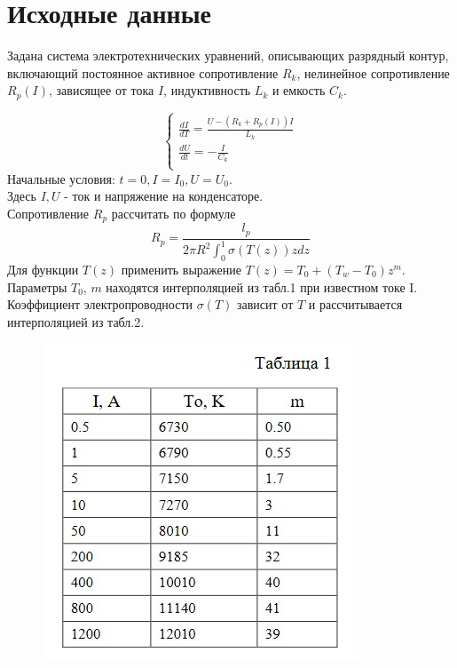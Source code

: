 \documentclass[14pt, a4paper]{extarticle}
\begin{document}
\section*{Исходные данные} 
Задана  система  электротехнических  уравнений,  описывающих  разрядный  контур, включающий постоянное активное сопротивление $R_k$, нелинейное сопротивление $R_p(I)$, зависящее от тока $I$, индуктивность $L_k$ и емкость $C_k$.\par
\begin{equation*}
	\begin{cases}
		\frac{dI}{dT} = \frac{U - (R_k + R_p(I))I}{L_k} \\
		\frac{dU}{dt} = - \frac{I}{C_k}\\
	\end{cases}
\end{equation*}
Начальные условия: $t = 0, I = I_0, U = U_0$.\\
Здесь $I, U$ - ток и напряжение на конденсаторе.\\
Сопротивление $R_p$ рассчитать по формуле
\begin{equation*}
	R_p = \frac{l_p}{2 \pi R^2 \int_{0}^{1}\sigma(T(z))zdz}
\end{equation*}
Для функции $T(z)$ применить выражение $T(z) = T_0 + (T_w - T_0)z^m$.\\
Параметры $T_0$, $m$ находятся интерполяцией из табл.1 при известном токе I.\\
Коэффициент электропроводности $\sigma(T)$ зависит от $T$ и рассчитывается интерполяцией из табл.2.
\begin{figure}[h]
	\centering
	\includegraphics[scale=0.8]{source/Table1.jpg}
\end{figure}\par
\end{document}

